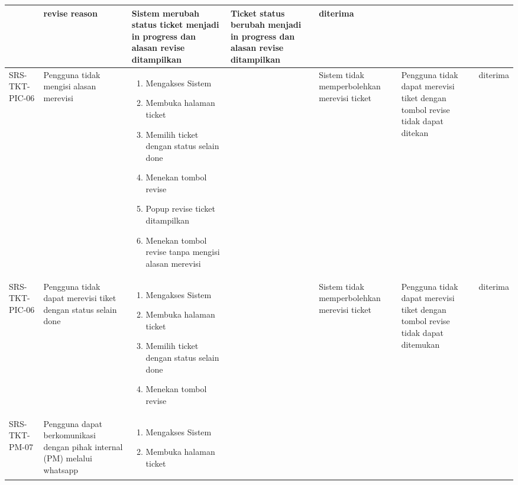 \documentclass[12pt]{article}
\begin{document}
\begin{enumerate}[label=\textbf{5.\arabic*.}]
\begin{enumerate}[label=\textbf{5.2.\arabic*.}]
\begin{landscape}
\begin{longtable}{ |l|p{}|p{}|p{}|p{}|p{}|l| }
\begin{enumerate}[label=\arabic*.]
                \end{enumerate} 
                & revise reason & Sistem merubah status ticket menjadi in progress dan alasan revise ditampilkan
                & Ticket status berubah menjadi in progress dan alasan revise ditampilkan& diterima \\
                \hline
                SRS-TKT-PIC-06 & Pengguna tidak mengisi alasan merevisi & 
                \begin{enumerate}[label=\arabic*.] 
                    \item Mengakses Sistem
                    \item Membuka halaman ticket
                    \item Memilih ticket dengan status selain done
                    \item Menekan tombol revise
                    \item Popup revise ticket ditampilkan
                    \item Menekan tombol revise tanpa mengisi alasan merevisi
                \end{enumerate} 
                &  & Sistem tidak memperbolehkan merevisi ticket 
                & Pengguna tidak dapat merevisi tiket dengan tombol revise tidak dapat ditekan & diterima \\
                \hline
                SRS-TKT-PIC-06 & Pengguna tidak dapat merevisi tiket dengan status selain done & 
                \begin{enumerate}[label=\arabic*.] 
                    \item Mengakses Sistem
                    \item Membuka halaman ticket
                    \item Memilih ticket dengan status selain done
                    \item Menekan tombol revise
                \end{enumerate} 
                &  & Sistem tidak memperbolehkan merevisi ticket 
                & Pengguna tidak dapat merevisi tiket dengan tombol revise tidak dapat ditemukan & diterima \\
                \hline
                SRS-TKT-PM-07 & Pengguna dapat berkomunikasi dengan pihak internal (PM) melalui whatsapp & 
                \begin{enumerate}[label=\arabic*.] 
                    \item Mengakses Sistem
                    \item Membuka halaman ticket

\end{enumerate}
\end{longtable}
\end{landscape}
\end{enumerate}
\end{enumerate}
\end{document}
